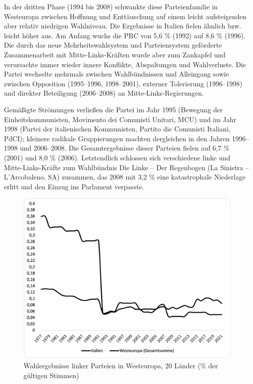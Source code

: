 \begin{multicols*}{2}
In der dritten Phase (1994 bis 2008) schwankte diese Parteienfamilie in Westeuropa zwischen Hoffnung und Enttäuschung auf einem leicht aufsteigenden aber relativ niedrigen Wahlniveau. Die Ergebnisse in Italien fielen ähnlich bzw. leicht höher aus. Am Anfang wuchs die PRC von 5,6 \% (1992) auf 8,6 \% (1996). Die durch das neue Mehrheitswahlsystem und Parteiensystem geförderte Zusammenarbeit mit Mitte-\-Links-\-Kräften wurde aber zum Zankapfel und verursachte immer wieder innere Konflikte, Abspaltungen und Wahlverluste. Die Partei wechselte mehrmals zwischen Wahlbündnissen und Alleingang sowie zwischen Opposition (1995–1996, 1998–2001), externer Tolerierung (1996–1998) und direkter Beteiligung (2006–2008) an Mitte-\-Links-\-Regierungen. 

Gemäßigte Strömungen verließen die Partei im Jahr 1995 (Bewegung der Einheitskommunisten, Movimento dei Comunisti Unitari, MCU) und im Jahr 1998 (Partei der italienischen Kommunisten, Partito die Comunisti Italiani, PdCI); kleinere radikale Gruppierungen machten dergleichen in den Jahren 1996–1998 und 2006–2008. Die  Gesamtergebnisse dieser Parteien fielen auf 6,7 \% (2001) und 8,0 \% (2006). Letztendlich schlossen sich verschiedene linke und Mitte-Links-Kräfte zum Wahlbündnis Die Linke – Der Regenbogen (La Sinistra – L’Arcobaleno, SA) zusammen, das 2008 mit 3,2 \% eine katastrophale Niederlage erlitt und den Einzug ins Parlament verpasste.

\begin{figure}
    \caption{Wahlergebnisse linker Parteien in Westeuropa, 20 Länder (\% der gültigen Stimmen)}
    \centering
    \includegraphics[scale=0.7]{../Bilder/grafik-wahlergebnisse.png}
\end{figure}


\end{multicols*}
